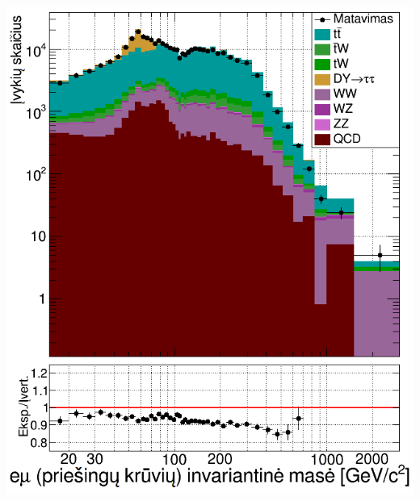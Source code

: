 \documentclass[xcolor=dvipsnames]{beamer}
\begin{document}
\begin{frame}
\begin{minipage}{0.46\textwidth}
		\includegraphics[width=\linewidth]{emuWQCD_SMALL.png}
	\end{minipage}
\end{frame}
\end{document}
